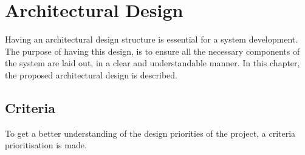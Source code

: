 \chapter{Architectural Design}
Having an architectural design structure is essential for a system development. The purpose of having this design, is to ensure all the necessary components of the system are laid out, in a clear and understandable manner. In this chapter, the proposed architectural design is described. 

\section{Criteria}
 To get a better understanding of the design priorities of the project, a criteria prioritisation is made. 
\\\\
